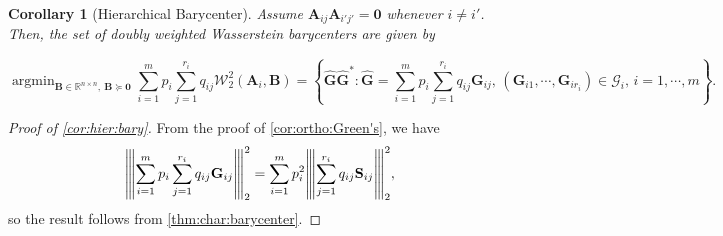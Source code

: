 \documentclass[noinfoline]{imsart}\setcounter{tocdepth}{2}
\renewcommand{\b}[1]{\mathbb{#1}} %
\newcommand{\m}[1]{\mathbf{#1}} %
\renewcommand{\c}[1]{\mathcal{#1}} %
\DeclareMathOperator*{\argmin}{\arg\min}
\newcommand{\vertiii}[1]{{\left\vert\kern-0.25ex\left\vert\kern-0.25ex\left\vert #1 
    \right\vert\kern-0.25ex\right\vert\kern-0.25ex\right\vert}} %
\theoremstyle{plain}
\newtheorem{corollary}[theorem]{Corollary}
\begin{document}
\begin{appendix}
\begin{corollary}[Hierarchical Barycenter]
Assume $\m{A}_{ij} \m{A}_{i'j'} = \m{0}$ whenever $i \ne i'$. Then, the set of doubly weighted Wasserstein barycenters are given by
\begin{small}
\begin{equation*}
    \argmin_{\m{B} \in \b{R}^{n \times n}, \ \m{B} \succeq \m{0}}  \sum_{i=1}^{m} p_{i} \sum_{j=1}^{r_{i}} q_{ij} \c{W}_{2}^{2}(\m{A}_{i}, \m{B}) = \left\{ \hat{\m{G}} \hat{\m{G}}^{*} : \hat{\m{G}} = \sum_{i=1}^{m} p_{i} \sum_{j=1}^{r_{i}} q_{ij} \m{G}_{ij}, \, (\m{G}_{i 1}, \cdots, \m{G}_{i r_{i}}) \in \c{G}_{i}, \, i =1, \cdots, m \right\}.
\end{equation*}    
\end{small}
\end{corollary}
\begin{proof}[Proof of \cref{cor:hier:bary}]
From the proof of \cref{cor:ortho:Green's}, we have
\begin{align*}
    \vertiii{\sum_{i=1}^{m} p_{i} \sum_{j=1}^{r_{i}} q_{ij} \m{G}_{ij}}_{2}^{2} = \sum_{i=1}^{m} p_{i}^{2} \vertiii{\sum_{j=1}^{r_{i}} q_{ij} \m{S}_{ij}}_{2}^{2},
\end{align*}
so the result follows from \cref{thm:char:barycenter}.
\end{proof}















\end{appendix}
\end{document}
